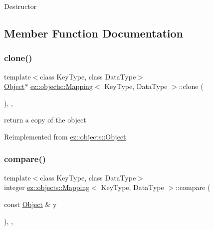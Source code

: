 Destructor 

\subsection{Member Function Documentation}
\mbox{\label{classez_1_1objects_1_1Mapping_aa8eb01c13630ff6ab44438e9a25aa019}} 
\subsubsection{\texorpdfstring{clone()}{clone()}}
{\footnotesize\ttfamily template$<$class Key\+Type, class Data\+Type$>$ \\
\hyperlink{classez_1_1objects_1_1Object}{Object}$\ast$ \hyperlink{classez_1_1objects_1_1Mapping}{ez\+::objects\+::\+Mapping}$<$ Key\+Type, Data\+Type $>$\+::clone (\begin{DoxyParamCaption}{ }\end{DoxyParamCaption})\hspace{0.3cm}{\ttfamily [inline]}, {\ttfamily [override]}, {\ttfamily [virtual]}}

return a copy of the object 

Reimplemented from \hyperlink{classez_1_1objects_1_1Object_acf444b2581d898eb4b8c92c2d5865c9e}{ez\+::objects\+::\+Object}.

\mbox{\label{classez_1_1objects_1_1Mapping_a7eb092099b5f47b101e5c54a46373ff0}} 
\subsubsection{\texorpdfstring{compare()}{compare()}}
{\footnotesize\ttfamily template$<$class Key\+Type, class Data\+Type$>$ \\
integer \hyperlink{classez_1_1objects_1_1Mapping}{ez\+::objects\+::\+Mapping}$<$ Key\+Type, Data\+Type $>$\+::compare (\begin{DoxyParamCaption}\item[{const \hyperlink{classez_1_1objects_1_1Object}{Object} \&}]{y }\end{DoxyParamCaption})\hspace{0.3cm}{\ttfamily [inline]}, {\ttfamily [override]}, {\ttfamily [virtual]}}

